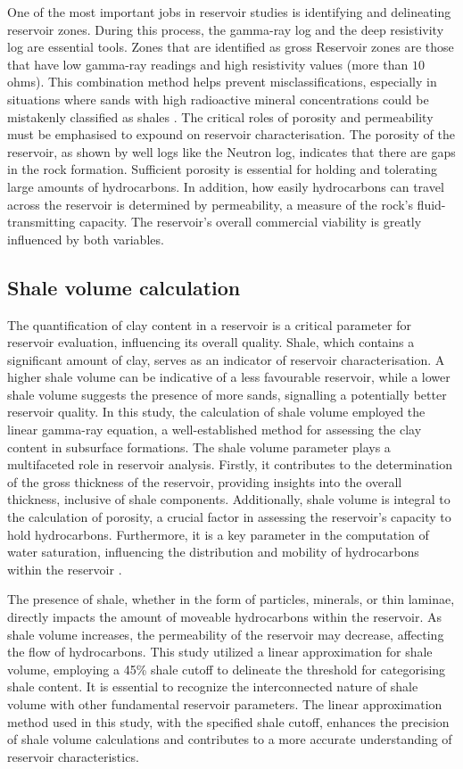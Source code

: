 \documentclass{gji}
\begin{document}
One of the most important jobs in reservoir studies is identifying and delineating reservoir zones.
During this process, the gamma-ray log and the deep resistivity log are essential tools. 
Zones that are identified as gross Reservoir zones are those that have low gamma-ray readings and high resistivity values (more than $10$ ohms). 
This combination method helps prevent misclassifications, especially in situations where sands with high radioactive mineral concentrations could be mistakenly classified as shales \citep{lai2023typical}.
The critical roles of porosity and permeability must be emphasised to expound on reservoir characterisation. 
The porosity of the reservoir, as shown by well logs like the Neutron log, indicates that there are gaps in the rock formation. 
Sufficient porosity is essential for holding and tolerating large amounts of hydrocarbons.
In addition, how easily hydrocarbons can travel across the reservoir is determined by permeability, a measure of the rock's fluid-transmitting capacity.
The reservoir's overall commercial viability is greatly influenced by both variables.


\subsection{Shale volume calculation} \label{subsec:Shale}
The quantification of clay content in a reservoir is a critical parameter for reservoir evaluation, influencing its overall quality.
Shale, which contains a significant amount of clay, serves as an indicator of reservoir characterisation. 
A higher shale volume can be indicative of a less favourable reservoir, while a lower shale volume suggests the presence of more sands, signalling a potentially better reservoir quality. 
In this study, the calculation of shale volume employed the linear gamma-ray equation, a well-established method for assessing the clay content in subsurface formations.
The shale volume parameter plays a multifaceted role in reservoir analysis.
Firstly, it contributes to the determination of the gross thickness of the reservoir, providing insights into the overall thickness, inclusive of shale components.
Additionally, shale volume is integral to the calculation of porosity, a crucial factor in assessing the reservoir's capacity to hold hydrocarbons.
Furthermore, it is a key parameter in the computation of water saturation, influencing the distribution and mobility of hydrocarbons within the reservoir \citep{szabo2013extending}.

The presence of shale, whether in the form of particles, minerals, or thin laminae, directly impacts the amount of moveable hydrocarbons within the reservoir.
As shale volume increases, the permeability of the reservoir may decrease, affecting the flow of hydrocarbons.
This study utilized a linear approximation for shale volume, employing a 45\% shale cutoff to delineate the threshold for categorising shale content.
It is essential to recognize the interconnected nature of shale volume with other fundamental reservoir parameters. 
The linear approximation method used in this study, with the specified shale cutoff, enhances the precision of shale volume calculations and contributes to a more accurate understanding of reservoir characteristics.
\end{document}
